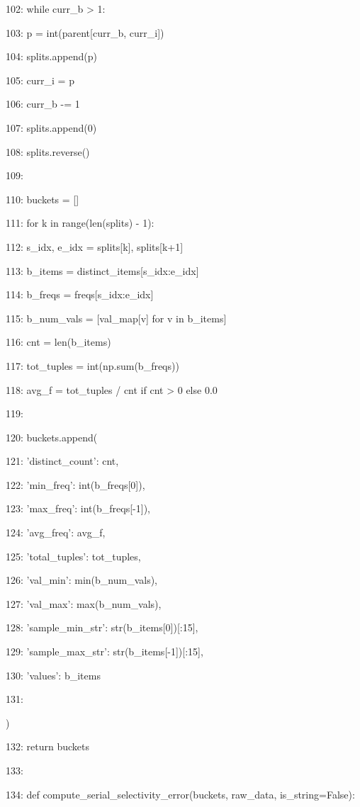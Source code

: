 \documentclass[11pt,a4paper]{article}
\begin{document}
102:     while curr\_b > 1:

103:         p = int(parent[curr\_b, curr\_i])

104:         splits.append(p)

105:         curr\_i = p

106:         curr\_b -= 1

107:     splits.append(0)

108:     splits.reverse()

109:

110:     buckets = []

111:     for k in range(len(splits) - 1):

112:         s\_idx, e\_idx = splits[k], splits[k+1]

113:         b\_items = distinct\_items[s\_idx:e\_idx]

114:         b\_freqs = freqs[s\_idx:e\_idx]

115:         b\_num\_vals = [val\_map[v] for v in b\_items]

116:         cnt = len(b\_items)

117:         tot\_tuples = int(np.sum(b\_freqs))

118:         avg\_f = tot\_tuples / cnt if cnt > 0 else 0.0

119:

120:         buckets.append({

121:             'distinct\_count': cnt,

122:             'min\_freq': int(b\_freqs[0]),

123:             'max\_freq': int(b\_freqs[-1]),

124:             'avg\_freq': avg\_f,

125:             'total\_tuples': tot\_tuples,

126:             'val\_min': min(b\_num\_vals),

127:             'val\_max': max(b\_num\_vals),

128:             'sample\_min\_str': str(b\_items[0])[:15],

129:             'sample\_max\_str': str(b\_items[-1])[:15],

130:             'values': b\_items

131:         })

132:     return buckets

133:

134: def compute\_serial\_selectivity\_error(buckets, raw\_data, is\_string=False):
\end{document}

